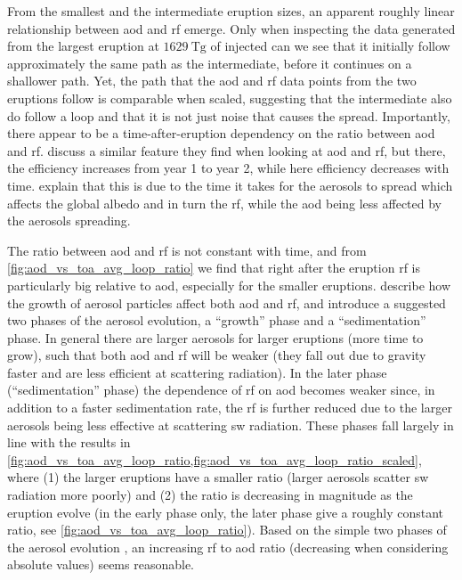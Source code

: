 \documentclass{ametsocV5}
\newcommand{\iso}[1][i]{{#1}njected \ce{SO2}}
\begin{document}
From the smallest and the intermediate eruption sizes, an apparent roughly linear
relationship between \ac{aod} and \ac{rf} emerge. Only when inspecting the data
generated from the largest eruption at \(\SI{1629}{\tera\gram}\) of \iso{} can we see
that it initially follow approximately the same path as the intermediate, before it
continues on a shallower path. Yet, the path that the \ac{aod} and \ac{rf} data points
from the two eruptions follow is comparable when scaled, suggesting that the
intermediate also do follow a loop and that it is not just noise that causes the spread.
Importantly, there appear to be a time-after-eruption dependency on the ratio between
\ac{aod} and \ac{rf}. \citet{marshall2020} discuss a similar feature they find when
looking at \ac{aod} and \ac{rf}, but there, the efficiency increases from year 1 to year
2, while here efficiency decreases with time. \citet{marshall2020} explain that this is
due to the time it takes for the aerosols to spread which affects the global albedo and
in turn the \ac{rf}, while the \ac{aod} being less affected by the aerosols spreading.


The ratio between \ac{aod} and \ac{rf} is not constant with time, and from
\cref{fig:aod_vs_toa_avg_loop_ratio} we find that right after the eruption \ac{rf} is
particularly big relative to \ac{aod}, especially for the smaller eruptions.
\citet[][see their sections 3.1.2, 3.2.2]{marshall2019} describe how the growth of
aerosol particles affect both \ac{aod} and \ac{rf}, and introduce a suggested two phases
of the aerosol evolution, a ``growth'' phase and a ``sedimentation'' phase. In general
there are larger aerosols for larger eruptions (more time to grow), such that both
\ac{aod} and \ac{rf} will be weaker (they fall out due to gravity faster and are less
efficient at scattering radiation).
In the later phase (``sedimentation'' phase) the dependence of \ac{rf} on \ac{aod}
becomes weaker since, in addition to a faster sedimentation rate, the \ac{rf} is further
reduced due to the larger aerosols being less effective at scattering \ac{sw} radiation.
These phases fall largely in line with the results in
\cref{fig:aod_vs_toa_avg_loop_ratio,fig:aod_vs_toa_avg_loop_ratio_scaled}, where (1) the
larger eruptions have a smaller ratio (larger aerosols scatter \ac{sw} radiation more
poorly) and (2) the ratio is decreasing in magnitude as the eruption evolve (in the
early phase only, the later phase give a roughly constant ratio, see
\cref{fig:aod_vs_toa_avg_loop_ratio}). Based on the simple two phases of the aerosol
evolution \citep{marshall2019}, an increasing \ac{rf} to \ac{aod} ratio (decreasing when
considering absolute values) seems reasonable.
\end{document}
